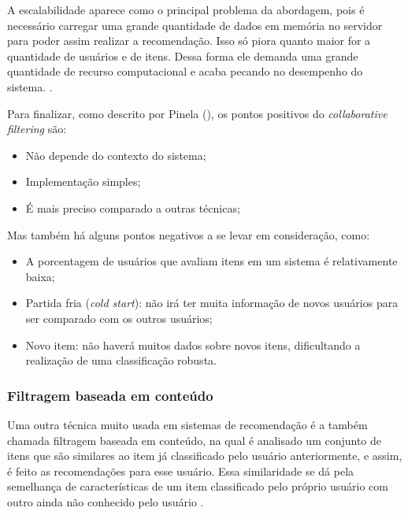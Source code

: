 A escalabilidade aparece como o principal problema da abordagem, pois é necessário carregar uma grande quantidade de dados em memória no servidor para poder assim realizar a recomendação. Isso só piora quanto maior for a quantidade de usuários e de itens. Dessa forma ele demanda uma grande quantidade de recurso computacional e acaba pecando no desempenho do sistema. \cite{Grover:2017}.

Para finalizar, como descrito por Pinela (\citeyear{Pinela:2017}), os pontos positivos do \textit{collaborative filtering} são:

\begin{itemize}
    \item Não depende do contexto do sistema;
    
    \item Implementação simples;
    
    \item É mais preciso comparado a outras técnicas;
\end{itemize}

Mas também há alguns pontos negativos a se levar em consideração, como:

\begin{itemize}
    \item A porcentagem de usuários que avaliam itens em um sistema é relativamente baixa;
    
    \item Partida fria (\textit{cold start}): não irá ter muita informação de novos usuários para ser comparado com os outros usuários;
    
    \item Novo item: não haverá muitos dados sobre novos itens, dificultando a realização de uma classificação robusta.
\end{itemize}

\subsubsection{Filtragem baseada em conteúdo}
\label{Contentbasedfiltering}

Uma outra técnica muito usada em sistemas de recomendação é a também chamada filtragem baseada em conteúdo, na qual é analisado um conjunto de itens que são similares ao item já classificado pelo usuário anteriormente, e assim, é feito as recomendações para esse usuário. Essa similaridade se dá pela semelhança de características de um item classificado pelo próprio usuário com outro ainda não conhecido pelo usuário \cite{Grimaldi:2018}. 

